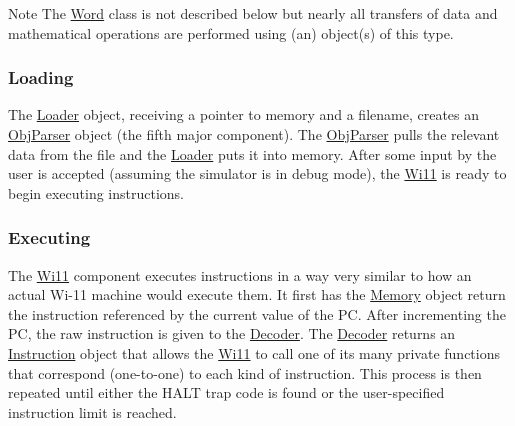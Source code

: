 \begin{DoxyNote}{Note}
The \hyperlink{classWord}{Word} class is not described below but nearly all transfers of data and mathematical operations are performed using (an) object(s) of this type.
\end{DoxyNote}
\hypertarget{index_loading}{}\subsubsection{Loading}\label{index_loading}
The \hyperlink{classLoader}{Loader} object, receiving a pointer to memory and a filename, creates an \hyperlink{classObjParser}{ObjParser} object (the fifth major component). The \hyperlink{classObjParser}{ObjParser} pulls the relevant data from the file and the \hyperlink{classLoader}{Loader} puts it into memory. After some input by the user is accepted (assuming the simulator is in debug mode), the \hyperlink{classWi11}{Wi11} is ready to begin executing instructions.\hypertarget{index_execution}{}\subsubsection{Executing}\label{index_execution}
The \hyperlink{classWi11}{Wi11} component executes instructions in a way very similar to how an actual Wi-\/11 machine would execute them. It first has the \hyperlink{classMemory}{Memory} object return the instruction referenced by the current value of the PC. After incrementing the PC, the raw instruction is given to the \hyperlink{classDecoder}{Decoder}. The \hyperlink{classDecoder}{Decoder} returns an \hyperlink{structInstruction}{Instruction} object that allows the \hyperlink{classWi11}{Wi11} to call one of its many private functions that correspond (one-\/to-\/one) to each kind of instruction. This process is then repeated until either the HALT trap code is found or the user-\/specified instruction limit is reached.


